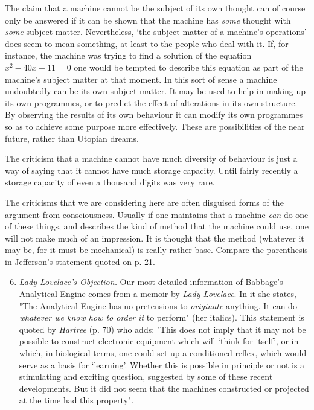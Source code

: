 \documentclass[12pt]{article}
\begin{document}
    The claim that a machine cannot be the subject of its own thought can of course only be answered if it can be shown that the machine has \textit{some} thought with \textit{some} subject matter. Nevertheless, ‘the subject matter of a machine's operations' does seem to mean something, at least to the people who deal with it. If, for instance, the machine was trying to find a solution of the equation $x^2 - 40x - 11 = 0$ one would be tempted to describe this equation as part of the machine's subject matter at that moment. In this sort of sense a machine undoubtedly can be its own subject matter. It may be used to help in making up its own programmes, or to predict the effect of alterations in its own structure. By observing the results of its own behaviour it can modify its own programmes so as to achieve some purpose more effectively. These are possibilities of the near future, rather than Utopian dreams.

    The criticism that a machine cannot have much diversity of behaviour is just a way of saying that it cannot have much storage capacity. Until fairly recently a storage capacity of even a thousand digits was very rare.

    The criticisms that we are considering here are often disguised forms of the argument from consciousness. Usually if one maintains that a machine \textit{can} do one of these things, and describes the kind of method that the machine could use, one will not make much of an impression. It is thought that the method (whatever it may be, for it must be mechanical) is really rather base. Compare the parenthesis in Jefferson's statement quoted on p. 21.

    \begin{enumerate}[label=(\arabic*)]
        \setcounter{enumi}{5}
        \item{\textit{Lady Lovelace's Objection.} Our most detailed information of Babbage's Analytical Engine comes from a memoir by \textit{Lady Lovelace}. In it she states, "The Analytical Engine has no pretensions to \textit{originate} anything. It can do \textit{whatever we know how to order it} to perform" (her italics). This statement is quoted by \textit{Hartree} (p. 70) who adds: "This does not imply that it may not be possible to construct electronic equipment which will ‘think for itself', or in which, in biological terms, one could set up a conditioned reflex, which would serve as a basis for ‘learning'. Whether this is possible in principle or not is a stimulating and exciting question, suggested by some of these recent developments. But it did not seem that the machines constructed or projected at the time had this property".}
    \end{enumerate}
\end{document}
